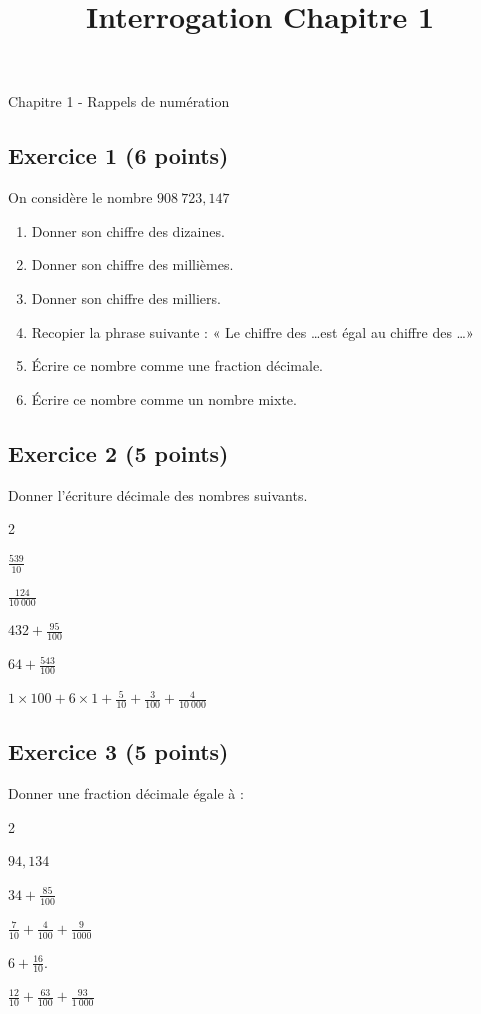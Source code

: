 \documentclass[14 pt]{extarticle}
\title{Interrogation Chapitre 1}
\date{}
\theoremstyle{plain}
\begin{document}
\begin{center}{\Large Chapitre 1 - Rappels de  numération}\\ 
 \end{center}
  
  \subsection*{Exercice 1 (6 points)}
  
  On considère le nombre $908\ 723, 147$
  
  \begin{enumerate}
  \item Donner son chiffre des dizaines. 
  \item Donner son chiffre des millièmes. 
  \item Donner son chiffre des milliers. 
  \item Recopier la phrase suivante : « Le chiffre des \ldots est égal au chiffre des \ldots »
  \item Écrire ce nombre comme une fraction décimale. 
  \item Écrire ce nombre comme un nombre mixte.
  \end{enumerate}
  
  \subsection*{Exercice 2 (5 points)}
  Donner l'écriture décimale des nombres suivants. 
  \begin{enumerate}
  \begin{multicols}{2}
  \item $\displaystyle\frac{539}{10}$
  \item $\displaystyle\frac{124}{10~000}$
  \item $\displaystyle432+ \frac{95}{100}$
  \item $\displaystyle64+\frac{543}{100}$
  \item $\displaystyle1\times 100 + 6 \times 1 + \frac5{10} + \frac3{100} + \frac4{10~000}$
  \end{multicols}
  \end{enumerate}
  
  \subsection*{Exercice 3 (5 points)}
  Donner une fraction décimale égale à : 
  \begin{enumerate}
 \begin{multicols}{2} \item $\displaystyle94,134$
  \item $\displaystyle34+ \frac{85}{100}$
  \item $\displaystyle\frac{7}{10} + \frac4{100} + \frac{9}{1000}$
  \item $\displaystyle6 + \frac{16}{10}$. 
  \item $\displaystyle\frac{12}{10}+\frac{63}{100}+ \frac{93}{1~000}$
  \end{multicols}
  \end{enumerate}
  
\end{document}
